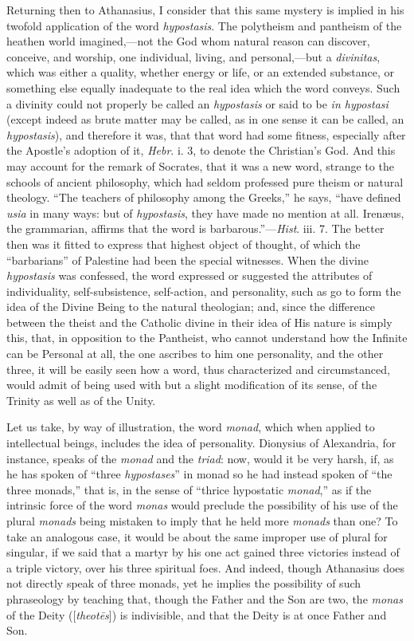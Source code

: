 Returning then to Athanasius, I consider that this same mystery is
implied in his twofold application of the word \emph{hypostasis}. The
polytheism and pantheism of the heathen world imagined,—not the God
whom natural reason can discover, conceive, and worship, one
individual, living, and personal,—but a \emph{divinitas}, which was
either a quality, whether energy or life, or an extended substance, or
something else equally inadequate to the real idea which the word
conveys. Such a divinity could not properly be called an \emph{hypostasis}
or said to be \emph{in hypostasi} (except indeed as brute matter may
be called, as in one sense it can be called, an \emph{hypostasis}),
and therefore it was, that that word had some fitness, especially
after the Apostle's adoption of it, \emph{Hebr}. i. 3, to denote the
Christian's God. And this may account for the remark of Socrates, that
it was a new word, strange to the schools of ancient philosophy, which
had seldom professed pure theism or natural theology. ``The
teachers of philosophy among the Greeks,'' he says, ``have
defined \emph{usia} in many ways: but of \emph{hypostasis}, they have
made no mention at all. Irenæus, the grammarian, affirms that the
word is barbarous.''—\emph{Hist}. iii. 7. The better then was it
fitted to express that highest object of thought, of which the
``barbarians'' of Palestine had been the special witnesses.
When the divine \emph{hypostasis} was confessed, the word
expressed or suggested the attributes of individuality,
self-subsistence, self-action, and personality, such as go to form the
idea of the Divine Being to the natural theologian; and, since the
difference between the theist and the Catholic divine in their idea of
His nature is simply this, that, in opposition to the Pantheist, who
cannot understand how the Infinite can be Personal at all, the one
ascribes to him one personality, and the other three, it will be
easily seen how a word, thus characterized and circumstanced, would
admit of being used with but a slight modification of its sense, of
the Trinity as well as of the Unity.

Let us take, by way of illustration, the word \emph{monad}, which
when applied to intellectual beings, includes the idea of personality.
Dionysius of Alexandria, for instance, speaks of the \emph{monad} and
the \emph{triad}: now, would it be very harsh, if, as he has spoken of
``three \emph{hypostases}'' in monad so he had instead spoken
of ``the three monads,'' that is, in the sense of ``thrice
hypostatic \emph{monad},'' as if the intrinsic force of the word \emph{monas}
would preclude the possibility of his use of the plural \emph{monads}
being mistaken to imply that he held more \emph{monads} than one? To
take an analogous case, it would be about the same improper use of
plural for singular, if we said that a martyr by his one act gained
three victories instead of a triple victory, over his three spiritual
foes. And indeed, though Athanasius does not directly speak of three
monads, yet he implies the possibility of such phraseology by teaching
that, though the Father and the Son are two, the \emph{monas} of the
Deity ([\emph{theot\={e}s}]) is indivisible, and that the Deity is
at once Father and Son.

